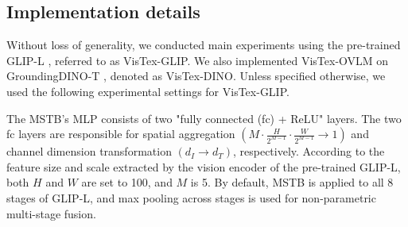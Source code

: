 \documentclass[10pt,twocolumn,letterpaper]{article}
\begin{document}


\subsection{Implementation details}

Without loss of generality, we conducted main experiments using the pre-trained GLIP-L \cite{li2022glip}, referred to as VisTex-GLIP. We also implemented VisTex-OVLM on GroundingDINO-T \cite{liu2023groundingdino}, denoted as VisTex-DINO. Unless specified otherwise, we used the following experimental settings for VisTex-GLIP.

The MSTB's MLP consists of two "fully connected (fc) + ReLU" layers. The two fc layers are responsible for spatial aggregation $\left( M\cdot \frac{H}{2^{M-1}} \cdot \frac{W}{2^{M-1}} \rightarrow 1 \right)$ and channel dimension transformation $\left( d_I \rightarrow d_T \right)$, respectively. According to the feature size and scale extracted by the vision encoder of the pre-trained GLIP-L, both $H$ and $W$ are set to 100, and $M$ is 5. By default, MSTB is applied to all 8 stages of GLIP-L, and max pooling across stages is used for non-parametric multi-stage fusion. %
\end{document}
